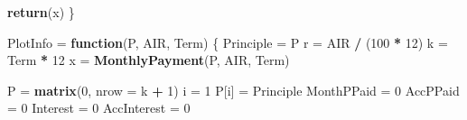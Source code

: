 \documentclass[12pt]{article}
\newenvironment{Section}[1]{}{\newpage}
\newenvironment{Shaded}{\begin{snugshade}}{\end{snugshade}}
\newcommand{\ControlFlowTok}[1]{\textcolor[rgb]{0.13,0.29,0.53}{\textbf{#1}}}
\newcommand{\DataTypeTok}[1]{\textcolor[rgb]{0.13,0.29,0.53}{#1}}
\newcommand{\DecValTok}[1]{\textcolor[rgb]{0.00,0.00,0.81}{#1}}
\newcommand{\KeywordTok}[1]{\textcolor[rgb]{0.13,0.29,0.53}{\textbf{#1}}}
\newcommand{\NormalTok}[1]{#1}
\newcommand{\OperatorTok}[1]{\textcolor[rgb]{0.81,0.36,0.00}{\textbf{#1}}}
\newcommand{\StringTok}[1]{\textcolor[rgb]{0.31,0.60,0.02}{#1}}
\begin{document}
\begin{Section}{Example A}
\begin{singlespace}
\begin{Shaded}
\begin{Highlighting}[]
  \KeywordTok{return}\NormalTok{(x)}
\NormalTok{\}}

\NormalTok{PlotInfo =}\StringTok{ }\ControlFlowTok{function}\NormalTok{(P, AIR, Term) \{}
\NormalTok{  Principle =}\StringTok{ }\NormalTok{P}
\NormalTok{  r =}\StringTok{ }\NormalTok{AIR }\OperatorTok{/}\StringTok{ }\NormalTok{(}\DecValTok{100} \OperatorTok{*}\StringTok{ }\DecValTok{12}\NormalTok{)}
\NormalTok{  k =}\StringTok{ }\NormalTok{Term }\OperatorTok{*}\StringTok{ }\DecValTok{12}
\NormalTok{  x =}\StringTok{ }\KeywordTok{MonthlyPayment}\NormalTok{(P, AIR, Term)}

\NormalTok{  P =}\StringTok{ }\KeywordTok{matrix}\NormalTok{(}\DecValTok{0}\NormalTok{, }\DataTypeTok{nrow =}\NormalTok{ k }\OperatorTok{+}\StringTok{ }\DecValTok{1}\NormalTok{)}
\NormalTok{  i =}\StringTok{ }\DecValTok{1}
\NormalTok{  P[i] =}\StringTok{ }\NormalTok{Principle}
\NormalTok{  MonthPPaid =}\StringTok{ }\DecValTok{0}
\NormalTok{  AccPPaid =}\StringTok{ }\DecValTok{0}
\NormalTok{  Interest =}\StringTok{ }\DecValTok{0}
\NormalTok{  AccInterest =}\StringTok{ }\DecValTok{0}


\end{Highlighting}
\end{Shaded}
\end{singlespace}
\end{Section}
\end{document}

